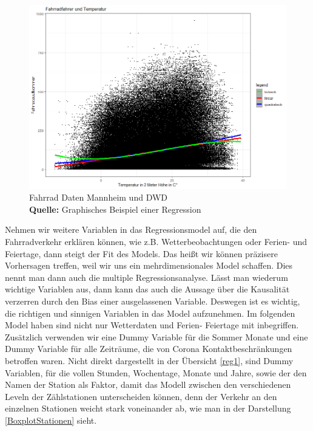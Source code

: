 \documentclass[a4paper,12pt]{thesis}
\newcommand*{\captionsource}[2]{%
	\caption[{#1}]{%
		#1%
		\\\hspace{\linewidth}%
		\textbf{Quelle:} #2%
	}%
}
\begin{document}
\begin{figure}[!ht]
	\centering
	\includegraphics[width=\textwidth]{Plots/Regression_Bsp.png}
	\captionsource{Fahrrad Daten Mannheim und DWD}{
		Graphisches Beispiel einer Regression
	}
	\label{Figure2}
\end{figure}

Nehmen wir weitere Variablen in das Regressionsmodel auf, die den Fahrradverkehr erklären können, wie z.B. Wetterbeobachtungen oder Ferien- und Feiertage, dann steigt der Fit des Models. Das heißt wir können präzisere Vorhersagen treffen, weil wir uns ein mehrdimensionales Model schaffen. Dies nennt man dann auch die multiple Regressionsanalyse. Lässt man wiederum wichtige Variablen aus, dann kann das auch die Aussage über die Kausalität verzerren durch den Bias einer ausgelassenen Variable. Deswegen ist es wichtig, die richtigen und sinnigen Variablen in das Model aufzunehmen. Im folgenden Model haben sind nicht nur Wetterdaten und Ferien- Feiertage mit inbegriffen. Zusätzlich verwenden wir eine Dummy Variable für die Sommer Monate und eine Dummy Variable für alle Zeiträume, die von Corona Kontaktbeschränkungen betroffen waren. Nicht direkt dargestellt in der Übersicht \ref{reg1}, sind Dummy Variablen, für die vollen Stunden, Wochentage, Monate und Jahre, sowie der den Namen der Station als Faktor, damit das Modell zwischen den verschiedenen Leveln der Zählstationen unterscheiden können, denn der Verkehr an den einzelnen Stationen weicht stark voneinander ab, wie man in der Darstellung \ref{BoxplotStationen} sieht.\\
\end{document}
